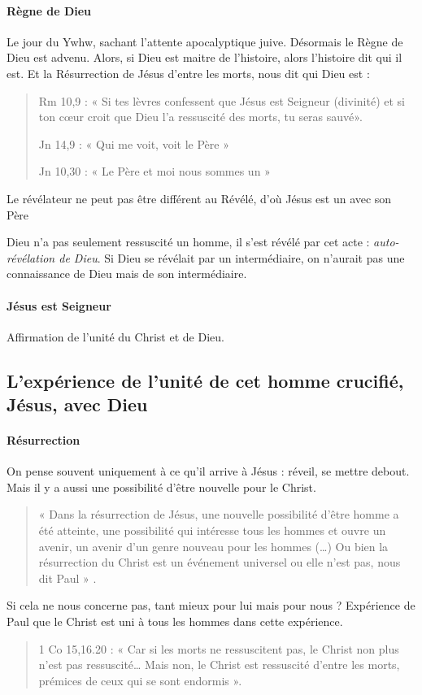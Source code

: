     \paragraph{Règne de Dieu} Le jour du Ywhw, sachant l'attente apocalyptique juive. Désormais le Règne de Dieu est advenu. Alors, si Dieu est maitre de l'histoire, alors l'histoire dit qui il est. Et la Résurrection de Jésus d'entre les morts, nous dit qui Dieu est : 
  \begin{quote}
    Rm  10,9  :  «  Si  tes  lèvres  confessent  que  Jésus  est  Seigneur  (divinité)  et  si  ton  cœur  croit  que Dieu l’a  ressuscité  des  morts, tu seras  sauvé».   
    
    Jn 14,9  :  «  Qui  me  voit, voit  le  Père  »   
    
    Jn 10,30  :  «  Le  Père  et  moi  nous  sommes  un  » 
\end{quote}
    
    \begin{Prop}
    Le révélateur ne peut pas être différent au Révélé, d'où Jésus est un avec son Père
    \end{Prop}
    Dieu n'a pas seulement ressuscité un homme, il s'est révélé par cet acte : \textit{auto-révélation de Dieu}. Si Dieu se révélait par un intermédiaire, on n'aurait pas une connaissance de Dieu mais de son intermédiaire.
    \paragraph{Jésus est Seigneur} Affirmation de l'unité du Christ et de Dieu.
    
    
\subsection{L'expérience de l'unité de cet homme crucifié, Jésus, avec Dieu}
    
    \paragraph{Résurrection} On pense souvent uniquement à ce qu'il arrive à Jésus : réveil, se mettre debout. Mais il y a aussi une possibilité d'être nouvelle pour le Christ.
    \begin{quote}
        «  Dans  la  résurrection  de  Jésus,  une  nouvelle  possibilité  d’être  homme  a  été  atteinte,  une possibilité  qui  intéresse  tous  les  hommes  et  ouvre  un  avenir,  un  avenir  d’un  genre  nouveau pour  les  hommes  (…)  Ou  bien  la  résurrection  du  Christ  est  un  événement  universel  ou  elle n’est  pas, nous  dit  Paul  »  .   
    \end{quote}
   Si cela ne nous concerne pas, tant mieux pour lui mais pour nous ? Expérience de Paul que le Christ est uni à tous les hommes dans cette expérience. 
   \begin{quote}
       1  Co  15,16.20  :  «  Car  si  les  morts  ne  ressuscitent  pas,  le  Christ  non  plus  n’est  pas ressuscité… Mais  non,  le  Christ  est  ressuscité  d’entre  les  morts,  prémices  de  ceux  qui  se  sont endormis  ». 
   \end{quote}
    

